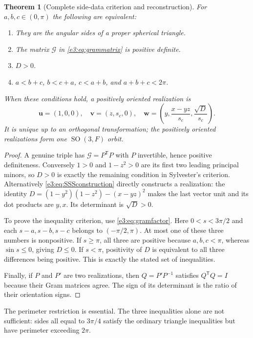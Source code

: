 \documentclass[11pt,letterpaper]{article}
\numberwithin{equation}{section}
\newtheorem{theorem}{Theorem}[section]
\theoremstyle{definition}
\theoremstyle{remark}
\newcommand{\SO}{\operatorname{SO}}
\newcommand{\vv}[1]{\bm{#1}}
\newcommand{\transpose}{^{\mathsf T}}
\begin{document}
\begin{theorem}[Complete side-data criterion and reconstruction]\label{e3:thm:SSS}
For $a,b,c\in(0,\pi)$ the following are equivalent:
\begin{enumerate}
\item They are the angular sides of a proper spherical triangle.
\item The matrix $\mathcal G$ in \cref{e3:eq:grammatrix} is positive definite.
\item $D>0$.
\item $a<b+c$, $b<c+a$, $c<a+b$, and $a+b+c<2\pi$.
\end{enumerate}
When these conditions hold, a positively oriented realization is
\begin{equation}\label{e3:eq:SSSconstruction}
 \vv u=(1,0,0),\quad
 \vv v=(z,s_c,0),\quad
 \vv w=\left(y,\frac{x-yz}{s_c},\frac{\sqrt D}{s_c}\right).
\end{equation}
It is unique up to an orthogonal transformation; the positively oriented
realizations form one $\SO(3,F)$ orbit.
\end{theorem}
\begin{proof}
A genuine triple has $\mathcal G=P\transpose P$ with $P$ invertible, hence
positive definiteness. Conversely $1>0$ and $1-z^2>0$ are its first two
leading principal minors, so $D>0$ is exactly the remaining condition in
Sylvester's criterion. Alternatively \cref{e3:eq:SSSconstruction} directly
constructs a realization: the identity
$D=(1-y^2)(1-z^2)-(x-yz)^2$ makes the last vector unit and its dot products
are $y,x$. Its determinant is $\sqrt D>0$.

To prove the inequality criterion, use \cref{e3:eq:gramfactor}. Here
$0<s<3\pi/2$ and each $s-a,s-b,s-c$ belongs to $(-\pi/2,\pi)$.
At most one of these three numbers is nonpositive. If $s\ge\pi$, all three
are positive because $a,b,c<\pi$, whereas $\sin s\le0$, giving $D\le0$.
If $s<\pi$, positivity of $D$ is equivalent to all three differences being
positive. This is exactly the stated set of inequalities.

Finally, if $P$ and $P'$ are two realizations, then
$Q=P'P^{-1}$ satisfies $Q\transpose Q=I$ because their Gram matrices agree.
The sign of its determinant is the ratio of their orientation signs.
\end{proof}

The perimeter restriction is essential. The three inequalities alone are
not sufficient: sides all equal to $3\pi/4$ satisfy the ordinary triangle
inequalities but have perimeter exceeding $2\pi$.
\end{document}
